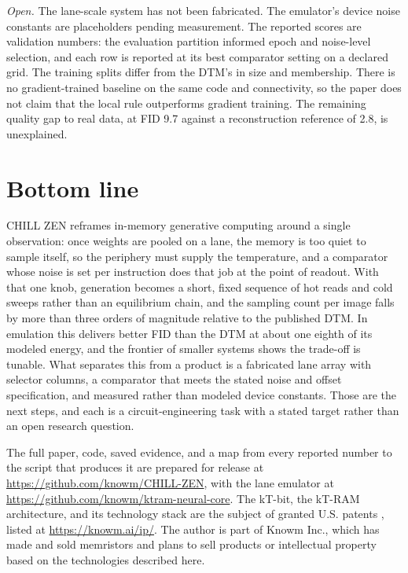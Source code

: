 \documentclass[reprint,amsmath,amssymb,aps,nofootinbib]{revtex4-2}
\begin{document}
\emph{Open.} The lane-scale system has not been fabricated. The
emulator's device noise constants are placeholders pending measurement.
The reported scores are validation numbers: the evaluation partition
informed epoch and noise-level selection, and each row is reported at
its best comparator setting on a declared grid. The training splits
differ from the DTM's in size and membership. There is no
gradient-trained baseline on the same code and connectivity, so the
paper does not claim that the local rule outperforms gradient
training. The remaining quality gap to real data, at FID 9.7 against a
reconstruction reference of 2.8, is unexplained.

\section{Bottom line}

CHILL ZEN reframes in-memory generative computing around a single
observation: once weights are pooled on a lane, the memory is too
quiet to sample itself, so the periphery must supply the temperature,
and a comparator whose noise is set per instruction does that job at
the point of readout. With that one knob, generation becomes a short,
fixed sequence of hot reads and cold sweeps rather than an equilibrium
chain, and the sampling count per image falls by more than three
orders of magnitude relative to the published DTM. In emulation this
delivers better FID than the DTM at about one eighth of its modeled
energy, and the frontier of smaller systems shows the trade-off is
tunable. What separates this from a product is a fabricated lane array
with selector columns, a comparator that meets the stated noise and
offset specification, and measured rather than modeled device
constants. Those are the next steps, and each is a circuit-engineering
task with a stated target rather than an open research question.

The full paper, code, saved evidence, and a map from every reported
number to the script that produces it are prepared for release at
\url{https://github.com/knowm/CHILL-ZEN}, with the lane emulator at
\url{https://github.com/knowm/ktram-neural-core}. The kT-bit, the
kT-RAM architecture, and its technology stack are the subject of
granted U.S. patents
\cite{nugent2015ktbitpatent,nugent2017ktrampatent,nugent2019stackpatent},
listed at \url{https://knowm.ai/ip/}. The author is part of Knowm
Inc., which has made and sold memristors and plans to sell products or
intellectual property based on the technologies described here.


\end{document}
